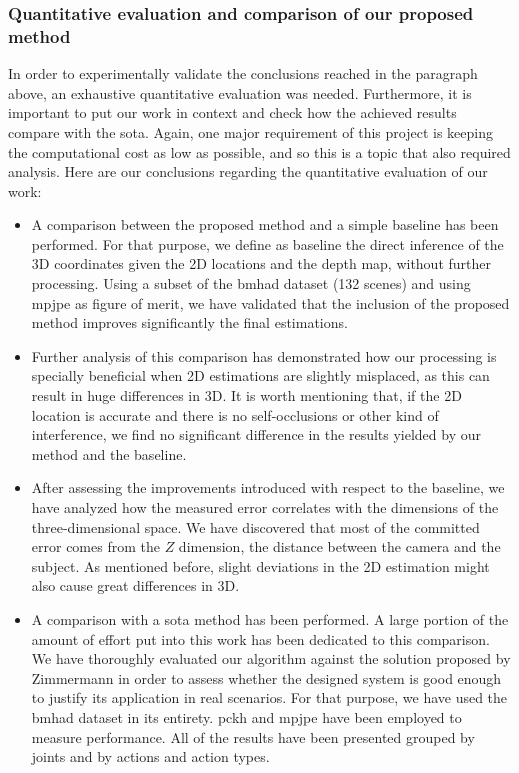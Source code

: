 \subsubsection{Quantitative evaluation and comparison of our proposed method}
In order to experimentally validate the conclusions reached in the paragraph above, an exhaustive quantitative evaluation was needed. Furthermore, it is important to put our work in context and check how the achieved results compare with the \gls{sota}. Again, one major requirement of this project is keeping the computational cost as low as possible, and so this is a topic that also required analysis. Here are our conclusions regarding the quantitative evaluation of our work:

\begin{itemize}
    \item A comparison between the proposed method and a simple baseline has been performed. For that purpose, we define as baseline the direct inference of the 3D coordinates given the 2D locations and the depth map, without further processing. Using a subset of the \gls{bmhad} dataset (132 scenes) and using \gls{mpjpe} as figure of merit, we have validated that the inclusion of the proposed method improves significantly the final estimations.
    \item Further analysis of this comparison has demonstrated how our processing is specially beneficial when 2D estimations are slightly misplaced, as this can result in huge differences in 3D. It is worth mentioning that, if the 2D location is accurate and there is no self-occlusions or other kind of interference, we find no significant difference in the results yielded by our method and the baseline.
    \item After assessing the improvements introduced with respect to the baseline, we have analyzed how the measured error correlates with the dimensions of the three-dimensional space. We have discovered that most of the committed error comes from the \(Z\) dimension, \ie  the distance between the camera and the subject. As mentioned before, slight deviations in the 2D estimation might also cause great differences in 3D.
    \item A comparison with a \gls{sota} method has been performed. A large portion of the amount of effort put into this work has been dedicated to this comparison. We have thoroughly evaluated our algorithm against the solution proposed by Zimmermann \etal\cite{Zimmermann2018-sn} in order to assess whether the designed system is good enough to justify its application in real scenarios. For that purpose, we have used the \gls{bmhad} dataset in its entirety. \gls{pckh} and \gls{mpjpe} have been employed to measure performance. All of the results have been presented grouped by joints and by actions and action types.

\end{itemize}
